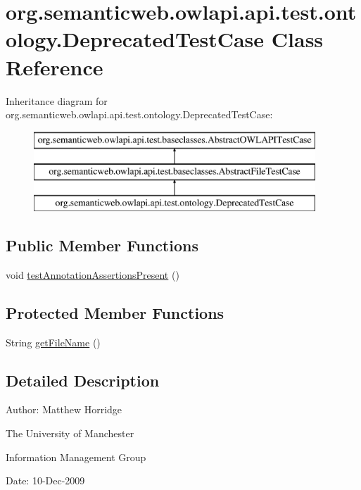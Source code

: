 \hypertarget{classorg_1_1semanticweb_1_1owlapi_1_1api_1_1test_1_1ontology_1_1_deprecated_test_case}{\section{org.\-semanticweb.\-owlapi.\-api.\-test.\-ontology.\-Deprecated\-Test\-Case Class Reference}
\label{classorg_1_1semanticweb_1_1owlapi_1_1api_1_1test_1_1ontology_1_1_deprecated_test_case}
}
Inheritance diagram for org.\-semanticweb.\-owlapi.\-api.\-test.\-ontology.\-Deprecated\-Test\-Case\-:\begin{figure}[H]
\begin{center}
\leavevmode
\includegraphics[height=3.000000cm]{classorg_1_1semanticweb_1_1owlapi_1_1api_1_1test_1_1ontology_1_1_deprecated_test_case}
\end{center}
\end{figure}
\subsection*{Public Member Functions}
\begin{DoxyCompactItemize}
\item 
void \hyperlink{classorg_1_1semanticweb_1_1owlapi_1_1api_1_1test_1_1ontology_1_1_deprecated_test_case_a8b5f18335b1c5f92324fd6c784c15d58}{test\-Annotation\-Assertions\-Present} ()
\end{DoxyCompactItemize}
\subsection*{Protected Member Functions}
\begin{DoxyCompactItemize}
\item 
String \hyperlink{classorg_1_1semanticweb_1_1owlapi_1_1api_1_1test_1_1ontology_1_1_deprecated_test_case_a924d302eeef22f3256e90dfc761be0c2}{get\-File\-Name} ()
\end{DoxyCompactItemize}


\subsection{Detailed Description}
Author\-: Matthew Horridge\par
 The University of Manchester\par
 Information Management Group\par
 Date\-: 10-\/\-Dec-\/2009 

